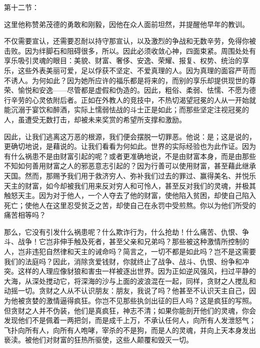 第十二节：\par

这里他称赞弟茂德的勇敢和刚毅，因他在众人面前坦然，并提醒他早年的教训。\par

\par

不仅需要宣认，还需要忍耐以持守那宣认，以及激烈的争战和无数辛劳，免得你被击败。因为绊脚石和阻碍很多，所以。因此必须收敛心神，四面束紧。周围处处有享乐吸引灵魂的眼目：美貌、财富、奢侈、安逸、荣耀、报复、权势、统治的享乐，这些外表美丽可爱，足以俘获不坚定、不爱真理的人。因为真理的面容严苛而不诱人。为何如此？因为她所应许的福乐都是将来的，而别的享乐却提供现世的尊荣、愉悦和安逸——尽管都是虚假和伪造的。因此，粗俗、柔弱、怯懦、不愿为德行辛劳的心灵依附后者。正如在外教人的竞技中，不热切渴望冠冕的人从一开始就能沉溺于宴饮和醉酒，实际上懦弱怯战的斗士正是如此；而那些坚定注视冠冕的人，虽遭受无数打击，却被未来奖赏的希望所支撑和激励。\par

因此，让我们逃离这万恶的根源，我们便会摆脱一切罪恶。他说：是；这是说的，更确切地说，是藉说的。让我们看看为何如此。世界的实际经验也为此作证。因为有什么祸患不是由财富引起的呢？或者更准确地说，不是由财富本身，而是由那些不知如何善用财富之人的邪恶意志引起的？因为行善可以使用财富，甚至藉此继承天国。然而，那赐予我们用于救济穷人、弥补我们过去的罪过、赢得美名、并悦乐天主的财富，如今却被我们用来反对穷人和可怜人，甚至反对我们的灵魂，并极其触怒天主。因为对于他人，一个人夺去了他的财富，使他陷入贫困，却使自己陷入死亡；使他人在这里忍受贫乏之苦，却使自己在永罚中受煎熬。你以为他们所受的痛苦相等吗？\par

那么，它没有引发什么祸患呢？什么欺诈行为，什么抢劫！什么痛苦、仇恨、争斗、战争！它岂非伸手触及死者，甚至父亲和兄弟吗？那些被这种激情所控制的人，岂非违犯自然律和天主的诫命吗？简言之，一切不都是如此吗？岂不是这需要我们的法庭吗？因此，消除贪爱钱财，你就终止了战争、战斗、仇恨、纷争和冲突。这样的人理应像豺狼和害虫一样被逐出世界。因为正如逆风强风，扫过平静的大海，从深处搅动它，将深海的沙与上面的波浪混在一起，同样，贪财之人搅乱和动摇一切。贪财之人从不认识朋友：朋友，我说了吗？他甚至不认识天主自己，因为他被贪婪的激情逼得疯狂。你岂不见那些执剑出征的巨人吗？这是疯狂的写照。但贪财之人并不伪装，他们是真疯狂，神志不清；如果你能剖开他们的灵魂，你会发现他们不是佩着一两把剑，而是成千上万，不承认任何人，向所有人发泄怒气；飞扑向所有人，向所有人咆哮，宰杀的不是狗，而是人的灵魂，并向上天本身发出亵渎。被他们对财富的狂热所驱使，这些人颠覆和毁灭一切。\par

